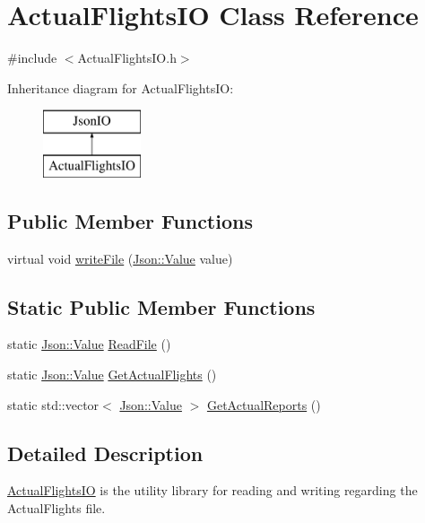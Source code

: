\hypertarget{class_actual_flights_i_o}{}\section{Actual\+Flights\+I\+O Class Reference}
\label{class_actual_flights_i_o}


{\ttfamily \#include $<$Actual\+Flights\+I\+O.\+h$>$}

Inheritance diagram for Actual\+Flights\+I\+O\+:\begin{figure}[H]
\begin{center}
\leavevmode
\includegraphics[height=2.000000cm]{class_actual_flights_i_o}
\end{center}
\end{figure}
\subsection*{Public Member Functions}
\begin{DoxyCompactItemize}
\item 
virtual void \hyperlink{class_actual_flights_i_o_a181dc53214b2e3d7d21c28d928e5f07b}{write\+File} (\hyperlink{class_json_1_1_value}{Json\+::\+Value} value)
\end{DoxyCompactItemize}
\subsection*{Static Public Member Functions}
\begin{DoxyCompactItemize}
\item 
static \hyperlink{class_json_1_1_value}{Json\+::\+Value} \hyperlink{class_actual_flights_i_o_a86f2cdffea634247d0b08aceed8106f9}{Read\+File} ()
\item 
static \hyperlink{class_json_1_1_value}{Json\+::\+Value} \hyperlink{class_actual_flights_i_o_a1b35a3e51049fb95e8c0acb9f6abea9a}{Get\+Actual\+Flights} ()
\item 
static std\+::vector$<$ \hyperlink{class_json_1_1_value}{Json\+::\+Value} $>$ \hyperlink{class_actual_flights_i_o_a7a0b1fea02b459f91c6e1bea365ab6c7}{Get\+Actual\+Reports} ()
\end{DoxyCompactItemize}


\subsection{Detailed Description}
\hyperlink{class_actual_flights_i_o}{Actual\+Flights\+I\+O} is the utility library for reading and writing regarding the Actual\+Flights file. 


